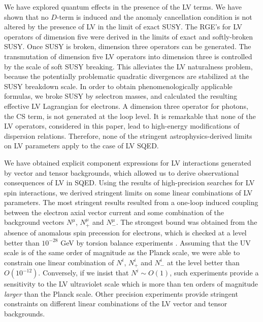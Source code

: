 \documentclass[12pt]{revtex4}
\begin{document}
We have explored quantum effects in the presence of the 
LV terms. We have shown that no $D$-term is induced and 
the anomaly cancellation condition is not altered by the presence of
LV in the limit of exact SUSY. The RGE's for LV operators of dimension
five were derived in the limits of exact and softly-broken SUSY. Once
SUSY is broken, dimension three operators can be generated.  
The transmutation of dimension five LV operators into dimension three
is controlled by the scale of soft SUSY breaking. This alleviates the 
LV naturalness problem, because the potentially problematic quadratic
divergences are stabilized at the SUSY breakdown scale.
In order to obtain phenomenologically applicable formulas, we broke
SUSY by selectron masses, and calculated the resulting effective
LV Lagrangian for electrons. A dimension three
operator for photons, the CS term, is not generated at the
loop level. It is remarkable that none of the LV operators, considered
in this paper, lead to high-energy modifications of dispersion relations.  
Therefore, none of the stringent astrophysics-derived limits on LV
parameters  \cite{Ted1,GK} apply to the case of LV SQED. 


We have obtained explicit component expressions for LV
interactions generated by vector and tensor backgrounds, which allowed
us to derive observational consequences of LV in SQED. Using the results
of high-precision searches for LV spin interactions, we derived  
stringent limits on some linear combinations of LV parameters. The most
stringent results resulted from a one-loop induced coupling between the
electron axial vector current and some combination of the background
vectors $N^\mu$, $N^\mu_+$ and $N^{\mu}_-$. The strongest bound was
obtained from the absence of anomalous spin precession for electrons,
which is checked at a level better than $10^{-28}$ GeV by
torsion balance experiments \cite{Heckel:1999sy}. Assuming that the UV
scale is of the same order of magnitude as the Planck scale, 
we were able to constrain one linear combination of $N^i$, $N^i_+$ and
$N^i_-$ at the level better than $O(10^{-12})$. Conversely, if we
insist that $N^i \sim O(1)$,  such experiments provide a sensitivity to
the LV ultraviolet scale which is more than ten orders of magnitude
{\em larger} than the Planck scale. Other precision experiments
\cite{clock1,clock2} provide stringent constraints on different
linear combinations of the LV vector and tensor backgrounds.
\end{document}
